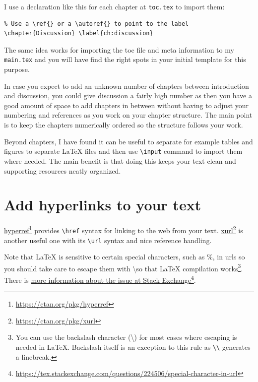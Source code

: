 I use a declaration like this for each chapter at \texttt{toc.tex} to import them:

\begin{verbatim}
% Use a \ref{} or a \autoref{} to point to the label
\chapter{Discussion} \label{ch:discussion}

\end{verbatim}

The same idea works for importing the toc file and meta information to my \texttt{main.tex} and you will have find the right spots in your initial template for this purpose.

In case you expect to add an unknown number of chapters between introduction and discussion, you could give discussion a fairly high number as then you have a good amount of space to add chapters in between without having to adjust your numbering and references as you work on your chapter structure. The main point is to keep the chapters numerically ordered so the structure follows your work.

Beyond chapters, I have found it can be useful to separate for example tables and figures to separate LaTeX files and then use \texttt{\textbackslash input} command to import them where needed.
The main benefit is that doing this keeps your text clean and supporting resources neatly organized.

\section{Add hyperlinks to your text}

\href{https://ctan.org/pkg/hyperref}{hyperref}\footnote{\url{https://ctan.org/pkg/hyperref}} provides \texttt{\textbackslash href} syntax for linking to the web from your text. \href{https://ctan.org/pkg/xurl}{xurl}\footnote{\url{https://ctan.org/pkg/xurl}} is another useful one with its \texttt{\textbackslash url} syntax and nice reference handling.

Note that LaTeX is sensitive to certain special characters, such as \%, in urls so you should take care to escape them with \textbackslash so that LaTeX compilation works\footnote{You can use the backslash character (\textbackslash) for most cases where escaping is needed in LaTeX. Backslash itself is an exception to this rule as \texttt{\textbackslash\textbackslash} generates a linebreak.}.
There is \href{https://tex.stackexchange.com/questions/224506/special-character-in-url}{more information about the issue at Stack Exchange}\footnote{\url{https://tex.stackexchange.com/questions/224506/special-character-in-url}}.


